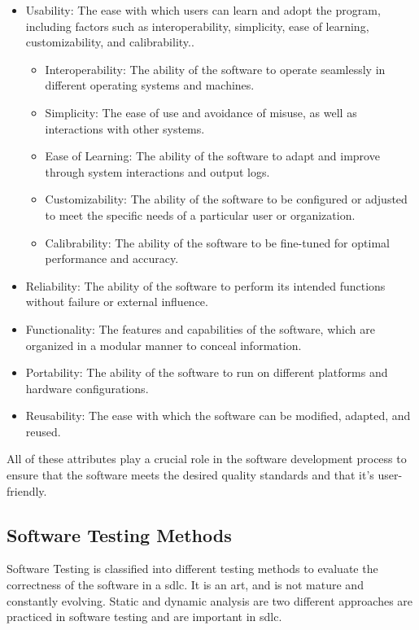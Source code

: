 \begin{itemize}
\item Usability: The ease with which users can learn and adopt the program, including factors
such as interoperability, simplicity, ease of learning, customizability,
and calibrability.\cite{mili2015software}.

\begin{itemize}
    \item Interoperability: The ability of the software to operate seamlessly in
    different operating systems and machines.
    \item Simplicity: The ease of use and avoidance of misuse,
    as well as interactions with other systems.
    \item Ease of Learning: The ability of the software to adapt and improve through system
    interactions and output logs.
    \item Customizability: The ability of the software to be configured or adjusted to meet the
    specific needs of a particular user or organization.
    \item Calibrability: The ability of the software to be fine-tuned for optimal performance
    and accuracy.
\end{itemize}

\item Reliability: The ability of the software to perform its intended functions without failure or
external influence.
\item Functionality: The features and capabilities of the software, which are organized in a
modular manner to conceal information.
\item Portability: The ability of the software to run on different platforms and
hardware configurations.
\item Reusability: The ease with which the software can be modified, adapted, and reused.
\end{itemize}

All of these attributes play a crucial role in the software development process to ensure that the
software meets the desired quality standards and that it's user-friendly.

\subsection{Software Testing Methods}
Software Testing is classified into different testing methods to evaluate the correctness of the software
in a \acrshort{sdlc}. It is an art, and is not mature and constantly evolving. Static and dynamic analysis
are two different approaches are practiced in software testing and are important in \acrshort{sdlc}.


